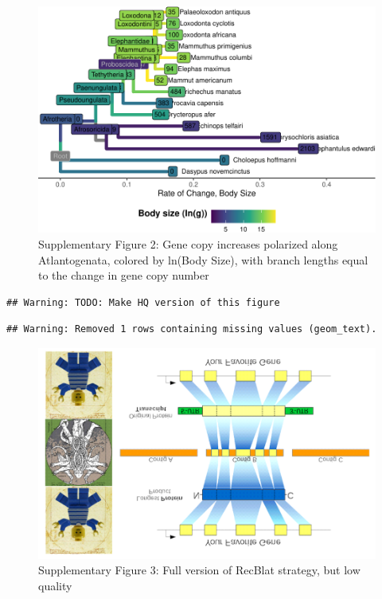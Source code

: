 \documentclass[10pt,letterpaper]{article}
\begin{document}
\begin{figure}
\centering
\includegraphics{paper_PLOS_draft_files/figure-latex/Supplementary Figure 2-1.pdf}
\caption{Supplementary Figure 2: Gene copy increases polarized along
Atlantogenata, colored by ln(Body Size), with branch lengths equal to
the change in gene copy number}
\end{figure}

\begin{verbatim}
## Warning: TODO: Make HQ version of this figure
\end{verbatim}

\begin{verbatim}
## Warning: Removed 1 rows containing missing values (geom_text).
\end{verbatim}

\begin{figure}
\centering
\includegraphics{paper_PLOS_draft_files/figure-latex/Supplementary Figure 3-1.pdf}
\caption{Supplementary Figure 3: Full version of RecBlat strategy, but
low quality}
\end{figure}
\end{document}
